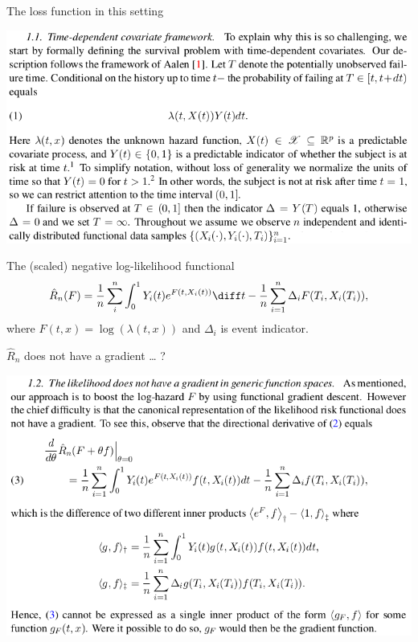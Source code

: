 \documentclass{beamer}\usepackage{listings}
\begin{document}
\begin{frame}[label={sec:org734afa0}]{The loss function in this setting}
\begin{center}
\includegraphics[width=.9\linewidth]{./screenshots/Screenshot_time-dependent-covar2.png}
\end{center} \pause
\begin{block}{The (scaled) negative log-likelihood functional}
\vspace{-0.5cm}
\begin{equation*}
  \hat{R}_n(F) = \frac{1}{n}\sum_{i}^{n}\int_0^1 Y_i(t)e^{F(t, X_i(t))} \diff t
  - \frac{1}{n}\sum_{i=1}^{n}\Delta_i F(T_i, X_i(T_i)),
\end{equation*}
where $F(t,x) = \log(\lambda(t,x))$ and $\Delta_i$ is event indicator. 
\end{block}
\end{frame}

\begin{frame}[label={sec:orgaec59e5}]{\(\hat{R}_n\) does not have a gradient \ldots{} ?}
\begin{center}
\includegraphics[width=.9\linewidth]{./screenshots/Screenshot_gradient.png}
\end{center}
\end{frame}
\end{document}
